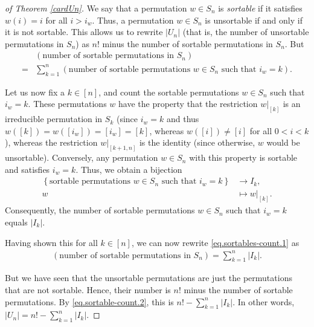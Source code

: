 \documentclass[final,nomarks]{dmtcs-episciences}
\theoremstyle{definition}
\theoremstyle{definition}
\theoremstyle{remark}
\newcommand{\tup}[1]{\left( #1 \right)}
\newcommand{\set}[1]{\left\{ #1 \right\}}
\newcommand{\card}[1]{\left| #1 \right|}
\begin{document}
\begin{proof}[of Theorem \ref{cardUn}]
We say that a permutation $w \in S_n$ is \emph{sortable} if it satisfies $w\tup{i} = i$ for all $i > i_w$.
Thus, a permutation $w \in S_n$ is unsortable if and only if it is not sortable.
This allows us to rewrite $\card{U_n}$ (that is, the number of unsortable permutations in $S_n$) as $n!$ minus the number of sortable permutations in $S_n$.
But
\begin{align}
    &\tup{\text{number of sortable permutations in $S_n$}} \nonumber\\
    =& \sum_{k=1}^n \tup{\text{number of sortable permutations $w \in S_n$ such that $i_w = k$}}.
    \label{eq.sortables-count.1}
\end{align}

Let us now fix a $k \in [n]$, and count the sortable permutations $w \in S_n$ such that $i_w = k$.
These permutations $w$ have the property that the restriction $ w|_{[k]} $ is an irreducible permutation in $ S_{k} $ (since $i_w = k$ and thus $w([k]) = w([i_w]) = [i_w] = [k]$, whereas $w([i]) \neq [i]$ for all $0 < i < k$), whereas the restriction $ w|_{[k+1,n]} $ is the identity (since otherwise, $w$ would be unsortable).
Conversely, any permutation $w \in S_n$ with this property is sortable and satisfies $i_w = k$.
Thus, we obtain a bijection
\begin{align*}
    \set{\text{sortable permutations $w \in S_n$ such that $i_w = k$}}
    &\to
    I_k , \\
    w &\mapsto w|_{[k]}.
\end{align*}
Consequently, the number of sortable permutations $w \in S_n$ such that $i_w = k$ equals $\card{I_k}$.

Having shown this for all $k \in [n]$, we can now rewrite \eqref{eq.sortables-count.1} as
\begin{align}
    \tup{\text{number of sortable permutations in $S_n$}}
    = \sum_{k=1}^n \card{I_k}.
    \label{eq.sortable-count.2}
\end{align}

But we have seen that the unsortable permutations are just the permutations that are not sortable. Hence, their number is $n!$ minus the number of sortable permutations.
By \eqref{eq.sortable-count.2}, this is $n! - \sum_{k=1}^n \card{I_k}$.
In other words, $\card{U_n} = n! - \sum_{k=1}^n \card{I_k}$.

\end{proof}
\end{document}
